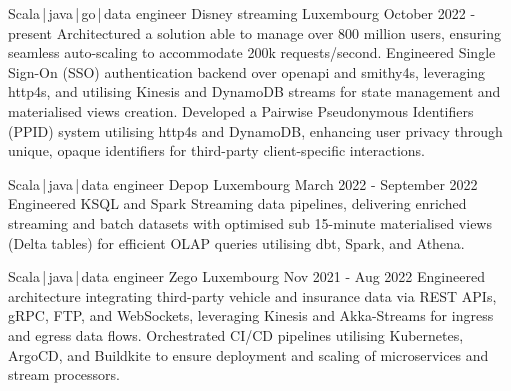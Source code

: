 
\newcommand*{\logo}[2]{\raisebox{-0.2em}{\texttt{[image: \#2]}}\hspace{0.25em}#1}
\newcommand*{\logoonly}[1]{\raisebox{-0.2em}{\texttt{[image: \#1]}}}


\begin{cventries}
    \cventry
    {Scala\,|\,java\,|\,go\,|\,data engineer}
    {\logo{Disney streaming}{../../../images/disney.png}} %
    {Luxembourg} %
    {October 2022 - present} %
    {}
    {
        Architectured a solution able to manage over 800 million users, ensuring seamless auto-scaling to accommodate 200k requests/second. Engineered Single Sign-On (SSO) authentication backend over openapi and smithy4s, leveraging http4s, and utilising Kinesis and DynamoDB streams for state management and materialised views creation.
    \newline
    Developed a Pairwise Pseudonymous Identifiers (PPID) system utilising http4s and DynamoDB, enhancing user privacy through unique, opaque identifiers for third-party client-specific interactions.
    }

    \cventry
    {Scala\,|\,java\,|\,data engineer}
    {\logo{Depop}{../../../images/depop.jpg}} %
    {Luxembourg} %
    {March 2022 - September 2022} %
    {}
    {
        Engineered KSQL and Spark Streaming data pipelines, delivering enriched streaming and batch datasets with optimised sub 15-minute materialised views (Delta tables) for efficient OLAP queries utilising dbt, Spark, and Athena.
    }


    \cventry
    {Scala\,|\,java\,|\,data engineer}
    {\logo{Zego}{../../../images/zego.jpg}} %
    {Luxembourg} %
    {Nov 2021 - Aug 2022} %
    {}
    {
        Engineered architecture integrating third-party vehicle and insurance data via REST APIs, gRPC, FTP, and WebSockets, leveraging Kinesis and Akka-Streams for ingress and egress data flows. Orchestrated CI/CD pipelines utilising Kubernetes, ArgoCD, and Buildkite to ensure deployment and scaling of microservices and stream processors.
    }


\end{cventries}
